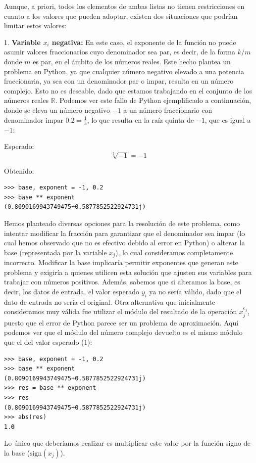 \documentclass[conference,a4paper]{IEEEtran}
\begin{document}
Aunque, a priori, todos los elementos de ambas listas no tienen restricciones en cuanto a los valores que pueden adoptar, existen dos situaciones que podrían limitar estos valores:


1. \textbf{Variable \( x_i \) negativa:} En este caso, el exponente de la función no puede asumir valores fraccionarios cuyo denominador sea par, es decir, de la forma \( k/m \) donde \( m \) es par, en el ámbito de los números reales. Este hecho plantea un problema en Python, ya que cualquier número negativo elevado a una potencia fraccionaria, ya sea con un denominador par o impar, resulta en un número complejo. Esto no es deseable, dado que estamos trabajando en el conjunto de los números reales \( \mathbb{R} \). Podemos ver este fallo de Python ejemplificado a continuación, donde se eleva un número negativo \( -1 \) a un número fraccionario con denominador impar \( 0.2 = \frac{1}{5} \), lo que resulta en la raíz quinta de \(-1\), que es igual a \(-1\):

Esperado:
\[
\sqrt[5]{-1} = -1
\]

Obtenido:
\begin{verbatim}
>>> base, exponent = -1, 0.2
>>> base ** exponent
(0.8090169943749475+0.5877852522924731j)
\end{verbatim}

Hemos planteado diversas opciones para la resolución de este problema, como intentar modificar la fracción para garantizar que el denominador sea impar (lo cual hemos observado que no es efectivo debido al error en Python) o alterar la base (representada por la variable \(x_j\)), lo cual consideramos completamente incorrecto. Modificar la base implicaría permitir exponentes que generan este problema y exigiría a quienes utilicen esta solución que ajusten sus variables para trabajar con números positivos. Además, sabemos que si alteramos la base, es decir, los datos de entrada, el valor esperado \(y_i\) ya no sería válido, dado que el dato de entrada no sería el original. Otra alternativa que inicialmente consideramos muy válida fue utilizar el módulo del resultado de la operación \(x_j^{e_j}\), puesto que el error de Python parece ser un problema de aproximación. Aquí podemos ver que el módulo del número complejo devuelto es el mismo módulo que el del valor esperado (1):
\begin{verbatim}
>>> base, exponent = -1, 0.2
>>> base ** exponent
(0.8090169943749475+0.5877852522924731j)
>>> res = base ** exponent
>>> res
(0.8090169943749475+0.5877852522924731j)
>>> abs(res)
1.0
\end{verbatim}
Lo único que deberíamos realizar es multiplicar este valor por la función signo de la base (\(\text{sign}(x_j)\)).
\end{document}
